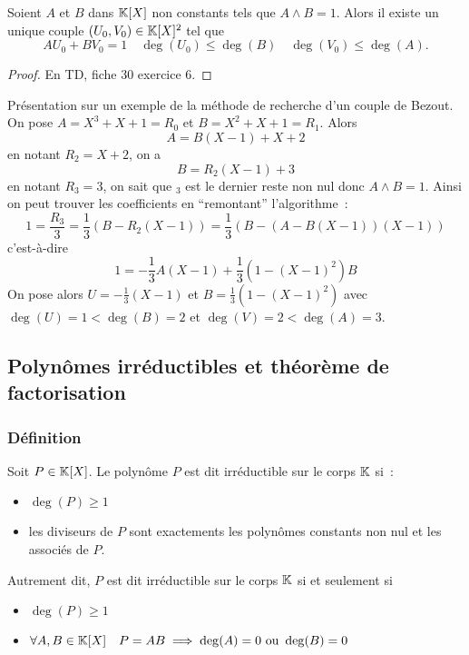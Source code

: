 \begin{prop}
  Soient $A$ et $B$ dans $\mathbb{K}[X]$ non constants tels que $A\wedge B=1$. Alors il existe un unique couple $(U_0,V_0) \in \mathbb{K}[X]^2$ tel que
  \begin{equation}
    AU_0+BV_0 = 1 \quad \deg(U_0) \leq \deg(B) \quad \deg(V_0) \leq \deg(A).
  \end{equation}
\end{prop}
\begin{proof}
  En TD, fiche 30 exercice 6.
\end{proof}

Présentation sur un exemple de la méthode de recherche d'un couple de Bezout. On pose $A=X^3+X+1=R_0$ et $B=X^2+X+1=R_1$. Alors
\begin{equation}
  A=B(X-1)+X+2
\end{equation}
en notant $R_2=X+2$, on a
\begin{equation}
  B=R_2(X-1)+3
\end{equation}
en notant $R_3=3$, on sait que $_3$ est le dernier reste non nul donc $A\wedge B=1$. Ainsi on peut trouver les coefficients en ``remontant'' l'algorithme~:
\begin{equation}
  1 = \frac{R_3}{3} = \frac{1}{3}(B-R_2(X-1)) = \frac{1}{3}(B-(A-B(X-1))(X-1))
\end{equation}
c'est-à-dire
\begin{equation}
  1 = -\frac{1}{3} A(X-1) + \frac{1}{3}(1-(X-1)^2)B
\end{equation}
On pose alors $U=-\frac{1}{3}(X-1)$ et $B=\frac{1}{3}(1-(X-1)^2)$ avec $\deg(U)=1 < \deg(B)=2$ et $\deg(V)=2 < \deg(A)=3$.

\subsection{Polynômes irréductibles et théorème de factorisation}

\subsubsection{Définition}

\begin{defdef}
  Soit $P \in \mathbb{K}[X]$. Le polynôme $P$ est dit irréductible sur le corps $\mathbb{K}$ si~:
  \begin{itemize}
  \item $\deg(P) \geq 1$
  \item les diviseurs de $P$ sont exactements les polynômes constants non nul et les associés de $P$.
  \end{itemize}
  Autrement dit, $P$ est dit irréductible sur le corps $\mathbb{K}$ si et seulement si
  \begin{itemize}
  \item $\deg(P) \geq 1$
  \item $\forall A,B \in \mathbb{K}[X] \quad P=AB \implies \deg(A)=0 \text{~ou~} \deg(B)=0$
  \end{itemize}
\end{defdef}

